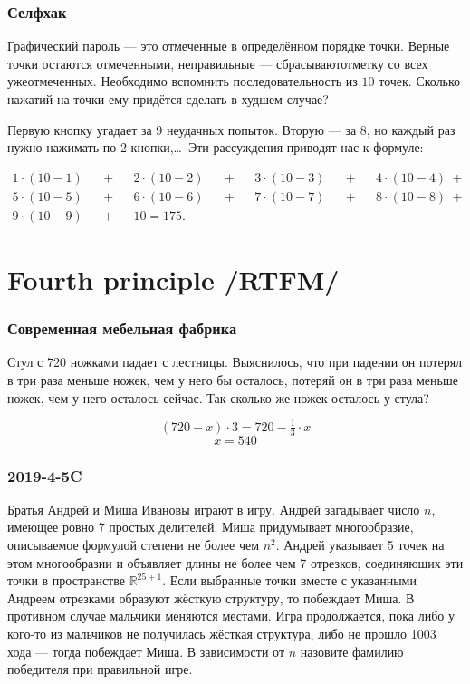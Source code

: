 \documentclass[aspectratio=1610,12pt]{beamer}
\def\fram#1#2{\begin{frame}\frametitle{#1}#2\end{frame}}
\def\usl#1{\vspace{-6mm} \begin{block}{\vspace*{-3ex}} #1 \end{block} \medskip\pause}
\def\uslx#1{\vspace{-6mm} \begin{block}{\vspace*{-3ex}} #1 \end{block}}
\begin{document}
\begin{frame} \frametitle{Селфхак}

\usl{Графический пароль --- это отмеченные в определённом порядке точки. Верные точки остаются отмеченными, неправильные --- сбрасываютотметку со всех ужеотмеченных. Необходимо вспомнить последовательность из $10$ точек. Сколько нажатий на точки ему придётся сделать в худшем случае?}

Первую кнопку угадает за 9 неудачных попыток. Вторую --- за 8, но каждый раз нужно нажимать по 2 кнопки,\ldots\ Эти рассуждения приводят нас к формуле:\vspace{-5mm}

\begin{align*}
 1 \cdot (10-1) &&+&& 2 \cdot (10-2) &&+&&  3 \cdot (10-3) &&+&&  4 \cdot (10-4)\ +\\
 5 \cdot (10-5) &&+&&  6 \cdot (10-6) &&+&&  7 \cdot (10-7) &&+&& 8 \cdot (10-8)\ +\\
 9 \cdot (10-9) &&+&& 10=  175.\ \
\end{align*}

\end{frame}


\section[Усл]{Fourth principle /RTFM/}

\fram{Современная мебельная фабрика}{
\usl{
	Стул с 720 ножками падает с лестницы. Выяснилось, что при падении он потерял в три раза меньше ножек, чем у него бы осталось, потеряй он в три раза меньше ножек, чем у него осталось сейчас. Так сколько же ножек осталось у стула?
}
$$(720 − x) \cdot 3 = 720 - \tfrac{1}{3} \cdot x$$
\vspace{-0.4cm}$$x = 540$$}

\fram{2019-4-5C}{
\uslx{
	Братья Андрей и Миша Ивановы играют в игру. Андрей загадывает число $n$, имеющее ровно 7 простых делителей. Миша придумывает многообразие, описываемое формулой степени не более чем $n^2$. Андрей указывает 5 точек на этом многообразии и объявляет длины не более чем 7 отрезков, соединяющих эти точки в пространстве $\mathbb{R}^{25+1}$. Если выбранные точки вместе с указанными Андреем отрезками образуют жёсткую структуру, то побеждает Миша. В противном случае мальчики меняются местами. Игра продолжается, пока либо у кого-то из мальчиков не получилась жёсткая структура, либо не прошло 1003 хода — тогда побеждает Миша. В зависимости от $n$ назовите фамилию победителя при правильной игре.
}}
\end{document}
